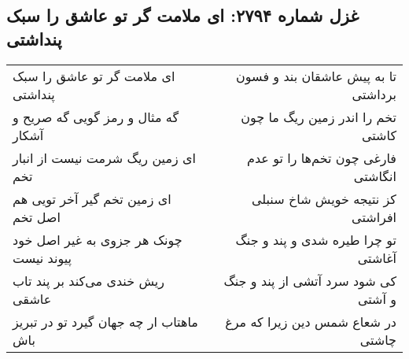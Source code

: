 \begin{center}
\section*{غزل شماره ۲۷۹۴: ای ملامت گر تو عاشق را سبک پنداشتی}
\label{sec:2794}
\begin{longtable}{l p{0.5cm} r}
ای ملامت گر تو عاشق را سبک پنداشتی
&&
تا به پیش عاشقان بند و فسون برداشتی
\\
گه مثال و رمز گویی گه صریح و آشکار
&&
تخم را اندر زمین ریگ ما چون کاشتی
\\
ای زمین ریگ شرمت نیست از انبار تخم
&&
فارغی چون تخم‌ها را تو عدم انگاشتی
\\
ای زمین تخم گیر آخر تویی هم اصل تخم
&&
کز نتیجه خویش شاخ سنبلی افراشتی
\\
چونک هر جزوی به غیر اصل خود پیوند نیست
&&
تو چرا طیره شدی و پند و جنگ آغاشتی
\\
ریش خندی می‌کند بر پند تاب عاشقی
&&
کی شود سرد آتشی از پند و جنگ و آشتی
\\
ماهتاب ار چه جهان گیرد تو در تبریز باش
&&
در شعاع شمس دین زیرا که مرغ چاشتی
\\
\end{longtable}
\end{center}
